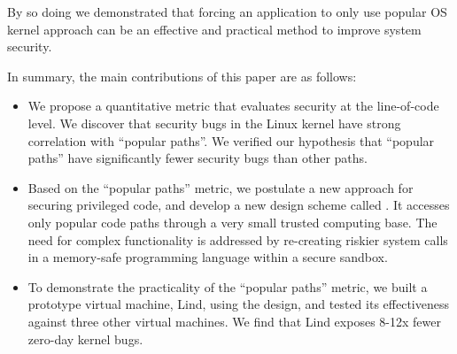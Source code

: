 By so doing we demonstrated that forcing an application to only use popular
OS kernel approach can be an effective and practical method to improve
system security.

In summary, the main contributions of this paper are as follows:

\begin{itemize}\setlength\itemsep{0em}

\item
We propose a quantitative metric that evaluates security at the line-of-code level. 
We discover that security bugs in the Linux kernel have strong correlation with ``popular paths''. 
We verified our hypothesis that ``popular paths'' have significantly fewer security bugs than other paths. 

\item
Based on the ``popular paths'' metric, we postulate a new approach for securing privileged code,
and develop a new design scheme called \lip. 
It accesses only popular code paths
through a very small trusted computing base.
The need for complex functionality is addressed by re-creating riskier system calls
in a memory-safe programming language within a secure sandbox.

\item
To demonstrate the practicality of the ``popular paths'' metric, we built a prototype virtual machine, Lind, using the \lip design,
and tested its effectiveness against three other virtual machines. 
We find that Lind exposes 8-12x fewer zero-day kernel bugs. 
\end{itemize}

